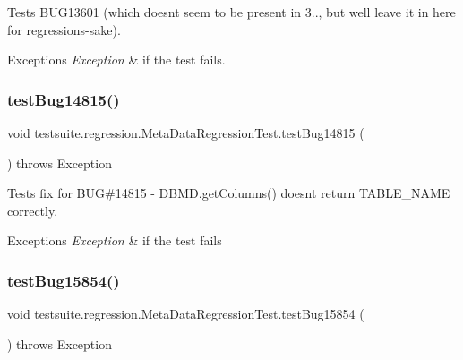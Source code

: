 Tests B\+U\+G13601 (which doesn\textquotesingle{}t seem to be present in 3.., but we\textquotesingle{}ll leave it in here for regression\textquotesingle{}s-\/sake).


\begin{DoxyExceptions}{Exceptions}
{\em Exception} & if the test fails. \\
\hline
\end{DoxyExceptions}
\mbox{\label{classtestsuite_1_1regression_1_1_meta_data_regression_test_a0b21041ed61d6a8c105f6d7ee954efbd}} 
\subsubsection{\texorpdfstring{test\+Bug14815()}{testBug14815()}}
{\footnotesize\ttfamily void testsuite.\+regression.\+Meta\+Data\+Regression\+Test.\+test\+Bug14815 (\begin{DoxyParamCaption}{ }\end{DoxyParamCaption}) throws Exception}

Tests fix for B\+UG\#14815 -\/ D\+B\+M\+D.\+get\+Columns() doesn\textquotesingle{}t return T\+A\+B\+L\+E\+\_\+\+N\+A\+ME correctly.


\begin{DoxyExceptions}{Exceptions}
{\em Exception} & if the test fails \\
\hline
\end{DoxyExceptions}
\mbox{\label{classtestsuite_1_1regression_1_1_meta_data_regression_test_ae112984f3c8acf28251912e13475421c}} 
\subsubsection{\texorpdfstring{test\+Bug15854()}{testBug15854()}}
{\footnotesize\ttfamily void testsuite.\+regression.\+Meta\+Data\+Regression\+Test.\+test\+Bug15854 (\begin{DoxyParamCaption}{ }\end{DoxyParamCaption}) throws Exception}

